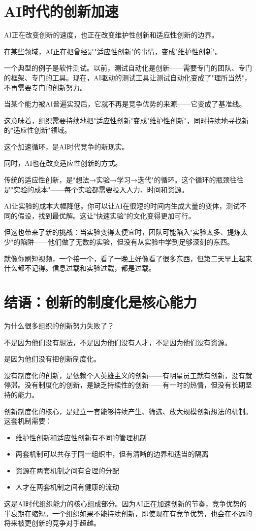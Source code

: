 \section{AI时代的创新加速}


AI正在改变创新的速度，也正在改变维护性创新和适应性创新的边界。

在某些领域，AI正在把曾经是"适应性创新"的事情，变成"维护性创新"。

一个典型的例子是软件测试。以前，测试自动化是创新——需要专门的团队、专门的框架、专门的工具。现在，AI驱动的测试工具让测试自动化变成了"理所当然"，不再需要专门的创新努力。

当某个能力被AI普遍实现后，它就不再是竞争优势的来源——它变成了基准线。

这意味着，组织需要持续地把"适应性创新"变成"维护性创新"，同时持续地寻找新的"适应性创新"领域。

这个加速循环，是AI时代竞争的新现实。

同时，AI也在改变适应性创新的方式。

传统的适应性创新，是"想法→实验→学习→迭代"的循环。这个循环的瓶颈往往是"实验的成本"——每个实验都需要投入人力、时间和资源。

AI让实验的成本大幅降低。你可以让AI在很短的时间内生成大量的变体，测试不同的假设，找到最优解。这让"快速实验"的文化变得更加可行。

但这也带来了新的挑战：当实验变得太便宜时，团队可能陷入"实验太多、提炼太少"的陷阱——他们做了无数的实验，但没有从实验中学到足够深刻的东西。

就像你刷短视频，一个接一个，看了一晚上好像看了很多东西，但第二天早上起来什么都不记得。信息过载和实验过载，都是过载。

\section{结语：创新的制度化是核心能力}


为什么很多组织的创新努力失败了？

不是因为他们没有想法，不是因为他们没有人才，不是因为他们没有资源。

是因为他们没有把创新制度化。

没有制度化的创新，是依赖个人英雄主义的创新——有明星员工就有创新，没有就停滞。没有制度化的创新，是缺乏持续性的创新——有一时的热情，但没有长期坚持的能力。

创新制度化的核心，是建立一套能够持续产生、筛选、放大规模创新想法的机制。这套机制需要：
\begin{itemize}
\item 维护性创新和适应性创新有不同的管理机制
\item 两套机制可以共存于同一组织中，但有清晰的边界和适当的隔离
\item 资源在两套机制之间有合理的分配
\item 人才在两套机制之间有健康的流动

\end{itemize}
这是AI时代组织能力的核心组成部分。因为AI正在加速创新的节奏，竞争优势的半衰期在缩短。一个组织如果不能持续创新，即使现在有竞争优势，也会在不远的将来被更创新的竞争对手超越。

